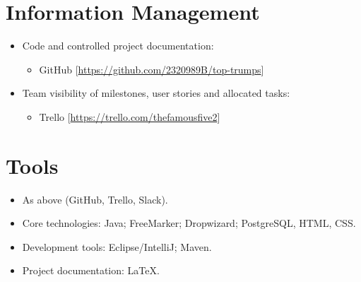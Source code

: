 \documentclass[a4paper, 12pt, titlepage]{article}
\begin{document}
    \section{Information Management}
    \begin{itemize}
        \item Code and controlled project documentation:
        \begin{itemize}
            \item GitHub [\url{https://github.com/2320989B/top-trumps}]
        \end{itemize}

        \item Team visibility of milestones, user stories and allocated tasks:
        \begin{itemize}
            \item Trello [\url{https://trello.com/thefamousfive2}]
        \end{itemize}
    \end{itemize}


    \section{Tools}
    \begin{itemize}
        \item As above (GitHub, Trello, Slack).
        \item Core technologies: Java; FreeMarker; Dropwizard; PostgreSQL, HTML, CSS.
        \item Development tools: Eclipse/IntelliJ; Maven.
        \item Project documentation: LaTeX.
    \end{itemize}
\end{document}
